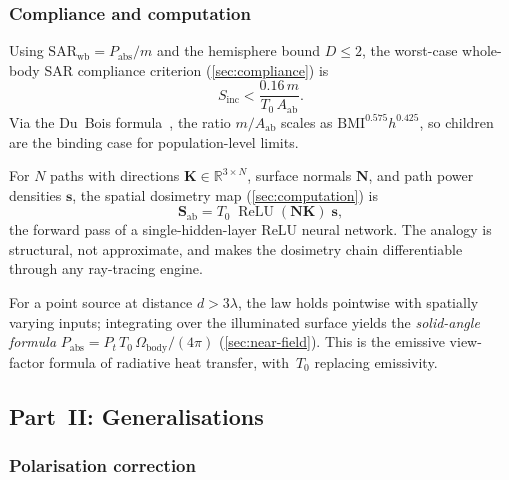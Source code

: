 \documentclass[11pt,a4paper]{article}
\theoremstyle{definition}      %
\newcommand{\Sinc}{S_{\mathrm{inc}}}
\newcommand{\Aab}{A_{\mathrm{ab}}}
\newcommand{\SARwb}{\mathrm{SAR}_{\mathrm{wb}}}
\DeclareMathOperator{\ReLU}{ReLU}
\begin{document}
\subsubsection*{Compliance and computation}

Using $\SARwb=P_{\mathrm{abs}}/m$ and the hemisphere bound $D\le2$,
the worst-case whole-body SAR compliance criterion (\cref{sec:compliance}) is
\begin{equation}\label{sum:eq:compliance-worst}
  \boxed{\Sinc < \frac{0.16\,m}{T_0\,\Aab}.}
\end{equation}
Via the Du~Bois formula~\cite{DuBois1916}, the ratio $m/\Aab$ scales as
$\mathrm{BMI}^{0.575}h^{0.425}$, so children are the binding case
for population-level limits.

For $N$ paths with directions $\mathbf{K}\in\mathbb{R}^{3\times N}$,
surface normals $\mathbf{N}$, and path power densities $\mathbf{s}$,
the spatial dosimetry map (\cref{sec:computation}) is
\begin{equation}\label{sum:eq:Sab-mat}
  \mathbf{S}_{\mathrm{ab}} = T_0\;\ReLU(\mathbf{N}\mathbf{K})\;\mathbf{s},
\end{equation}
the forward pass of a single-hidden-layer ReLU neural network.
The analogy is structural, not approximate, and makes the dosimetry chain
differentiable through any ray-tracing engine.

For a point source at distance $d>3\lambda$, the law holds pointwise
with spatially varying inputs; integrating over the illuminated surface
yields the \emph{solid-angle formula}
$P_{\mathrm{abs}}=P_t\,T_0\,\Omega_{\mathrm{body}}/(4\pi)$
(\cref{sec:near-field}).
This is the emissive view-factor formula of radiative heat transfer, with~$T_0$
replacing emissivity.

\subsection{Part~II: Generalisations}
\label{sum:part2}

\subsubsection*{Polarisation correction}
\end{document}
